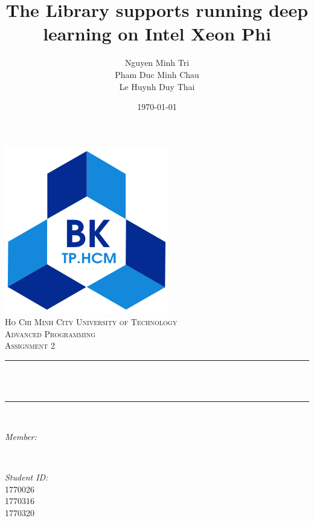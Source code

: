 \documentclass[12pt]{article}
\title{The Library supports running deep learning on Intel Xeon Phi}                             %
\author{
  Nguyen Minh Tri\\
  Pham Duc Minh Chau\\
  Le Huynh Duy Thai\\
 }
\date{\today}                                           %
\makeatletter
\let\thetitle\@title
\let\theauthor\@author
\let\thedate\@date
\makeatother
\begin{document}

\begin{titlepage}
    \centering
    \vspace*{0.5 cm}
    \includegraphics[scale = 0.5]{hcmut.png}\\[1.0 cm]   %
    \textsc{\Large Ho Chi Minh City University of Technology}\\[1.0 cm]   %
    \textsc{\Large Advanced Programming}\\[0.5 cm]               %
    \textsc{\large Assignment 2}\\[0.5 cm]               %
    \rule{\linewidth}{0.2 mm} \\[0.4 cm]
    { \LARGE \bfseries \thetitle}\\
    \rule{\linewidth}{0.2 mm} \\[1.5 cm]
    
    \begin{minipage}{0.4\textwidth}
        \begin{flushleft} \large
            \emph{Member:}\\
            \theauthor
            \end{flushleft}
            \end{minipage}~
            \begin{minipage}{0.4\textwidth}
            \begin{flushright} \large
            \emph{Student ID:} \\
            1770026 \\
            1770316\\
            1770320\\                                  %
        \end{flushright}
    \end{minipage}\\[2 cm]
    
    {\large \thedate}\\[2 cm]
 
    \vfill
    
\end{titlepage}
\end{document}
